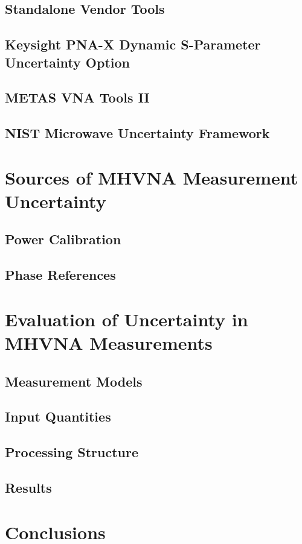 \documentclass[../thesis/thesis.tex]{subfiles}
\begin{document}
\begin{refsection}
\subsection{Standalone Vendor Tools}
\subsection{Keysight PNA-X Dynamic S-Parameter Uncertainty Option}
\subsection{METAS VNA Tools II}
\subsection{NIST Microwave Uncertainty Framework}
\section{Sources of MHVNA Measurement Uncertainty}
\subsection{Power Calibration}
\subsection{Phase References}
\section{Evaluation of Uncertainty in MHVNA Measurements}
\subsection{Measurement Models}
\subsection{Input Quantities}
\subsection{Processing Structure}
\subsection{Results}
\section{Conclusions}


\end{refsection}
\end{document}
